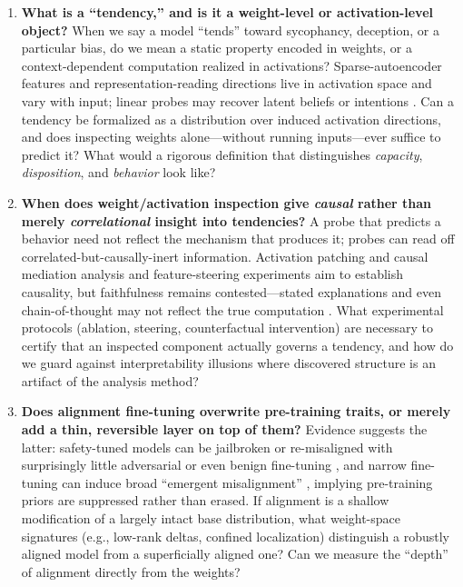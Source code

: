 \documentclass[11pt]{article}
\begin{document}
\begin{enumerate}[leftmargin=*,label=\textbf{Q\arabic*.}]

\item \textbf{What is a ``tendency,'' and is it a weight-level or activation-level object?}
When we say a model ``tends'' toward sycophancy, deception, or a particular bias, do we mean a static property encoded in weights, or a context-dependent computation realized in activations? Sparse-autoencoder features and representation-reading directions \citep{bricken2023monosemanticity,zou2023representation} live in activation space and vary with input; linear probes may recover latent beliefs or intentions \citep{burns2023discovering}. Can a tendency be formalized as a distribution over induced activation directions, and does inspecting weights alone---without running inputs---ever suffice to predict it? What would a rigorous definition that distinguishes \emph{capacity}, \emph{disposition}, and \emph{behavior} look like?

\item \textbf{When does weight/activation inspection give \emph{causal} rather than merely \emph{correlational} insight into tendencies?}
A probe that predicts a behavior need not reflect the mechanism that produces it; probes can read off correlated-but-causally-inert information. Activation patching and causal mediation analysis \citep{meng2022locating,wang2023interpretability} and feature-steering experiments \citep{templeton2024scaling} aim to establish causality, but faithfulness remains contested---stated explanations and even chain-of-thought may not reflect the true computation \citep{turpin2023language}. What experimental protocols (ablation, steering, counterfactual intervention) are necessary to certify that an inspected component actually governs a tendency, and how do we guard against interpretability illusions where discovered structure is an artifact of the analysis method?

\item \textbf{Does alignment fine-tuning overwrite pre-training traits, or merely add a thin, reversible layer on top of them?}
Evidence suggests the latter: safety-tuned models can be jailbroken or re-misaligned with surprisingly little adversarial or even benign fine-tuning \citep{qi2024finetuning}, and narrow fine-tuning can induce broad ``emergent misalignment'' \citep{betley2025emergent}, implying pre-training priors are suppressed rather than erased. If alignment is a shallow modification of a largely intact base distribution, what weight-space signatures (e.g., low-rank deltas, confined localization) distinguish a robustly aligned model from a superficially aligned one? Can we measure the ``depth'' of alignment directly from the weights?


\end{enumerate}
\end{document}
